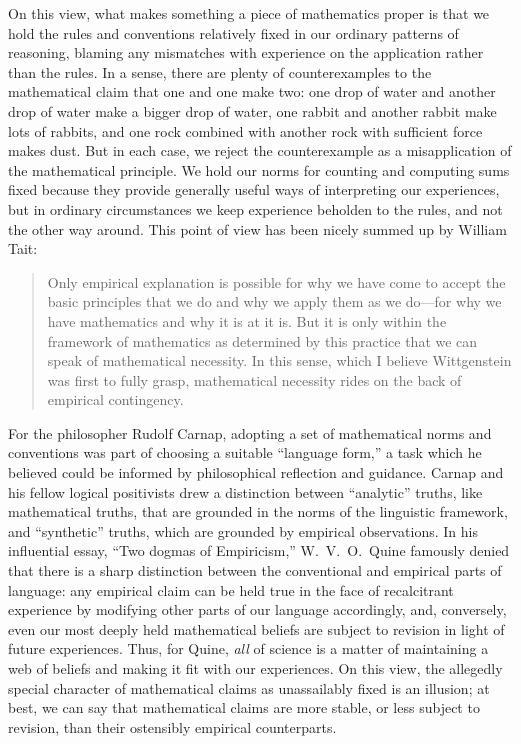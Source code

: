 \documentclass[12pt]{article}
\begin{document}
On this view, what makes something a piece of mathematics proper is that we hold the rules and conventions relatively fixed in our ordinary patterns of reasoning, blaming any mismatches with experience on the application rather than the rules. In a sense, there are plenty of counterexamples to the mathematical claim that one and one make two: one drop of water and another drop of water make a bigger drop of water, one rabbit and another rabbit make lots of rabbits, and one rock combined with another rock with sufficient force makes dust. But in each case, we reject the counterexample as a misapplication of the mathematical principle. We hold our norms for counting and computing sums fixed because they provide generally useful ways of interpreting our experiences, but in ordinary circumstances we keep experience beholden to the rules, and not the other way around. This point of view has been nicely summed up by William Tait:
\begin{quote}
Only empirical explanation is possible for why we have come to accept the basic principles that we do and why we apply them as we do---for why we have mathematics and why it is at it is. But it is only within the framework of mathematics as determined by this practice that we can speak of mathematical necessity. In this sense, which I believe Wittgenstein was first to fully grasp, mathematical necessity rides on the back of empirical contingency.
\end{quote}

For the philosopher Rudolf Carnap, adopting a set of mathematical norms and conventions was part of choosing a suitable ``language form,'' a task which he believed could be informed by philosophical reflection and guidance. Carnap and his fellow logical positivists drew a distinction between ``analytic'' truths, like mathematical truths, that are grounded in the norms of the linguistic framework, and ``synthetic'' truths, which are grounded by empirical observations. In his influential essay, ``Two dogmas of Empiricism,'' W.~V.~O.~Quine famously denied that there is a sharp distinction between the conventional and empirical parts of language: any empirical claim can be held true in the face of recalcitrant experience by modifying other parts of our language accordingly, and, conversely, even our most deeply held mathematical beliefs are subject to revision in light of future experiences. Thus, for Quine, \emph{all} of science is a matter of maintaining a web of beliefs and making it fit with our experiences. On this view, the allegedly special character of mathematical claims as unassailably fixed is an illusion; at best, we can say that mathematical claims are more stable, or less subject to revision, than their ostensibly empirical counterparts.
\end{document}
